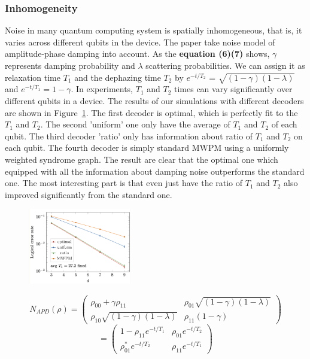 \subsubsection{Inhomogeneity}

Noise in many quantum computing system is spatially inhomogeneous, that is, it varies across different qubits in the device. The paper take noise model of amplitude-phase damping into account. As the \textbf{equation (6)(7)} shows, $\gamma$ represents damping probability and $\lambda$ scattering probabilities. We can assign it as relaxation time $T_1$ and the dephazing time $T_2$ by $e^{-t/T_2}$ = $\sqrt{(1-\gamma)(1-\lambda)}$ and $e^{-t/T_1} = 1 - \gamma$. In experiments, $T_1$ and $T_2$ times can vary significantly over different qubits in a device. The results of our simulations with different decoders are shown in Figure~\ref{fig:T1_fixed}. The first decoder is optimal, which is perfectly fit to the $T_1$ and $T_2$. The second 'uniform' one only have the average of $T_1$ and $T_2$ of each qubit. The third decoder 'ratio' only has information about ratio of $T_1$ and $T_2$ on each qubit. The fourth decoder is simply standard MWPM using a uniformly weighted syndrome graph. The result are clear that the optimal one which equipped with all the information about damping noise outperforms the standard one. The most interesting part is that even just have the ratio of $T_1$ and $T_2$ also improved significantly from the standard one.

\begin{figure}[h]
    \centering
    \includegraphics[width=0.4\textwidth]{sections/3_decoder/T1_fixed.png}
    \caption{}
    \label{fig:T1_fixed}
\end{figure}

$$ N_{APD}(\rho) =
    \left(\begin{array}{cc}
            \rho_{00} +  \gamma\rho_{11}          & \rho_{01}\sqrt{(1-\gamma)(1-\lambda)} \\
            \rho_{10}\sqrt{(1-\gamma)(1-\lambda)} & \rho_{11}(1-\gamma)
        \end{array}\right)
$$
$$=
    \left(\begin{array}{cc}
            1-\rho_{11}e^{-t/T_1} & \rho_{01}e^{-t/T_2} \\
            \rho_{01}^*e^{-t/T_2} & \rho_{11}e^{-t/T_1}
        \end{array}\right)
$$


